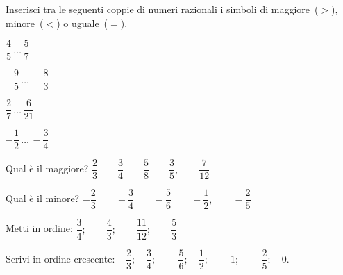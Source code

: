 \subsubsection*{}

\begin{esercizio}
\label{ese:3.29}
Inserisci tra le seguenti coppie di numeri razionali i simboli di 
maggiore~(\(>\)), minore~(\(<\)) o uguale~(\(=\)).

\begin{htmulticols}{4}
\begin{enumeratees}
\spazielenx
 \item \(\dfrac{4}{5}\,\ldots\,\dfrac{5}{7}\)
 \item \(-\dfrac{9}{5}\,\ldots\,-\dfrac{8}{3}\)
 \item \(\dfrac{2}{7}\,\ldots\,\dfrac{6}{21}\)
 \item \(-\dfrac{1}{2}\,\ldots\,-\dfrac{3}{4}\)
\end{enumeratees}
\end{htmulticols}
\end{esercizio}


\begin{esercizio}
\label{ese:3.30}
Qual è il maggiore? \qquad 
\(\dfrac{2}{3} \qquad \dfrac{3}{4} \qquad \dfrac{5}{8} \qquad \dfrac{3}{5},
\qquad \dfrac{7}{12}\)
\end{esercizio}

\begin{esercizio}
\label{ese:3.31}
Qual è il minore? \qquad 
\(-\dfrac{2}{3} \qquad -\dfrac{3}{4} \qquad -\dfrac{5}{6} \qquad 
-\dfrac{1}{2}, \qquad -\dfrac{2}{5}\)
\end{esercizio}

\begin{esercizio}
\label{ese:3.35}
Metti in ordine: \qquad
\(\dfrac{3}{4};\qquad\dfrac{4}{3};\qquad\dfrac{11}{12};\qquad\dfrac{5}{3}\)
\end{esercizio}

\begin{esercizio}
\label{ese:3.32}
Scrivi in ordine crescente:
% 
\(-\dfrac{2}{3}; \quad \dfrac{3}{4}; \quad -\dfrac{5}{6}; \quad 
\dfrac{1}{2}; \quad -1; \quad -\dfrac{2}{5}; \quad 0.\)
\end{esercizio}

